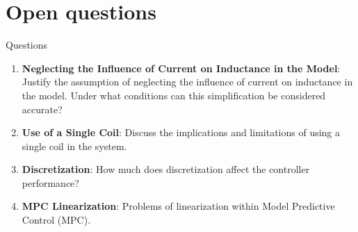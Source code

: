 \section{Open questions}

\begin{frame}{Questions}

    \begin{enumerate}
        \item \textbf{Neglecting the Influence of Current on Inductance in the Model}: Justify the assumption of neglecting the influence of current on inductance in the model. Under what conditions can this simplification be considered accurate?
        \item \textbf{Use of a Single Coil}: Discuss the implications and limitations of using a single coil in the system.
        \item \textbf{Discretization}: How much does discretization affect the controller performance?
        \item \textbf{MPC Linearization}: Problems of linearization within Model Predictive Control (MPC).
    \end{enumerate}

\end{frame}